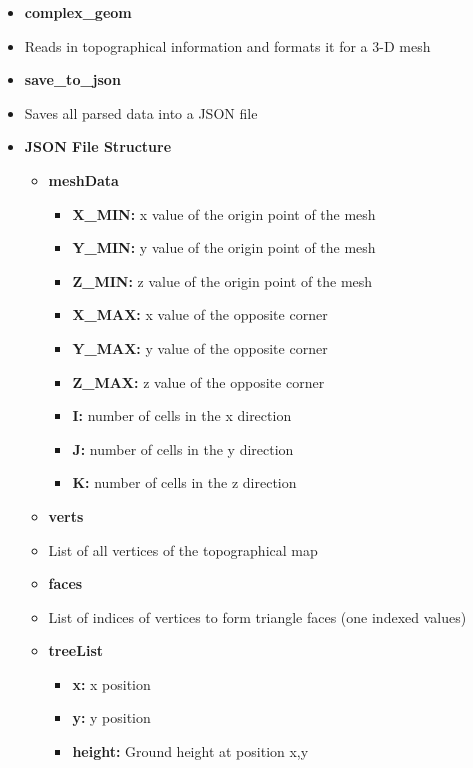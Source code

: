 \begin{itemize}
    \item \textbf{complex\_geom}
    \item[] Reads in topographical information and formats it for a 3-D mesh
    \item \textbf{save\_to\_json}
    \item[] Saves all parsed data into a JSON file
                \item[] \textbf{JSON File Structure}   
                \begin{itemize}
                \item\textbf{meshData}
                    \begin{itemize}
                    \item\textbf{X\_MIN:} x value of the origin point of the mesh 
                    \item\textbf{Y\_MIN:} y value of the origin point of the mesh 
                    \item\textbf{Z\_MIN:} z value of the origin point of the mesh 
                    \item\textbf{X\_MAX:} x value of the opposite corner
                    \item\textbf{Y\_MAX:} y value of the opposite corner
                    \item\textbf{Z\_MAX:} z value of the opposite corner
                    \item\textbf{I:} number of cells in the x direction
                    \item\textbf{J:} number of cells in the y direction
                    \item\textbf{K:} number of cells in the z direction
                    \end{itemize}
                \item\textbf{verts} 
                \item[] List of all vertices of the topographical map
                \item\textbf{faces} 
                \item[] List of indices of vertices to form triangle faces (one indexed values)
                \item\textbf{treeList}
                    \begin{itemize}
                    \item\textbf{x:} x position
                    \item\textbf{y:} y position
                    \item\textbf{height:} Ground height at position x,y

\end{itemize}
\end{itemize}
\end{itemize}
